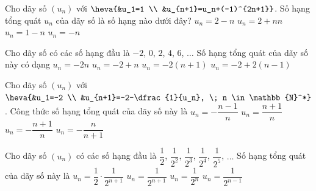 \begin{ex}%
	Cho dãy số $(u_n)$ với $\heva{&u_1=1 \\ &u_{n+1}=u_n+(-1)^{2n+1}}$. Số hạng tổng quát  $u_n$ của dãy số là số hạng nào dưới đây?
	 \choice
		{\True  $u_n=2-n$}
		{$u_n=2+nn$} 
		{$u_n=1-n$} 
		{$u_n=-n$} 
\end{ex}

\begin{ex}%
	Cho dãy số có các số  hạng đầu là $-2$, $0$, $2$, $4$, $6$, $\ldots$ Số hạng tổng quát của dãy số này có dạng
	\choice 
		{$u_n = -2n$} 
		{$u_n = -2 + n$} 
		{$u_n = -2(n+1)$} 
		{\True  $u_n = -2 + 2(n-1)$}
\end{ex}

\begin{ex}%
	Cho dãy số $(u_n)$ với $\heva{&u_1=-2 \\ &u_{n+1}=-2-\dfrac{1}{u_n}, \; n \in \mathbb{N}^*}$. 
	 Công thức số hạng tổng quát của dãy số này là
	\choice 
		{$u_n=-\dfrac{n-1}{n}$} 
		{$u_n=\dfrac{n+1}{n}$} 
		{\True  $u_n=-\dfrac{n+1}{n}$}
		 {$u_n=-\dfrac{n}{n+1}$}
\end{ex}

\begin{ex}%
	Cho dãy số $(u_n)$ có các số hạng đầu là $\dfrac{1}{2}$, $\dfrac{1}{2^2}$, $\dfrac{1}{2^3}$, $\dfrac{1}{2^4}$, $\dfrac{1}{2^5}$, $\ldots$ Số  hạng tổng quát của dãy số này là
	\choice 
		{$u_n = \dfrac{1}{2}  \cdot \dfrac{1}{2^{n+1}}$}
		 {$u_n = \dfrac{1}{2^{n+1}}$}
		 {\True $u_n = \dfrac{1}{2^n}$}
		{$u_n  = \dfrac{1}{2^{n-1}}$}
\end{ex}

